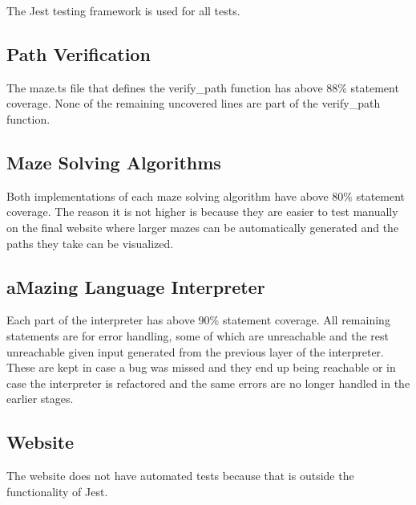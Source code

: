The Jest \cite{jest} testing framework is used for all tests.

\subsection{Path Verification}

The maze.ts file that defines the verify\_path function has above 88\% statement coverage. None of the remaining uncovered lines are part of the verify\_path function.

\subsection{Maze Solving Algorithms}

Both implementations of each maze solving algorithm have above 80\% statement coverage. The reason it is not higher is because they are easier to test manually on the final website where larger mazes can be automatically generated and the paths they take can be visualized.

\subsection{aMazing Language Interpreter}

Each part of the interpreter has above 90\% statement coverage. All remaining statements are for error handling, some of which are unreachable and the rest unreachable given input generated from the previous layer of the interpreter. These are kept in case a bug was missed and they end up being reachable or in case the interpreter is refactored and the same errors are no longer handled in the earlier stages.

\subsection{Website}

The website does not have automated tests because that is outside the functionality of Jest.
